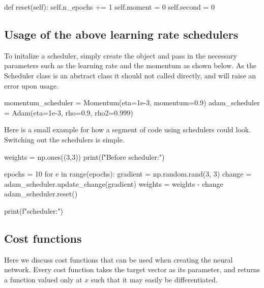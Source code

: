 \documentclass[%
oneside,                 %
final,                   %
10pt]{article}
\begin{document}
    def reset(self):
        self.n_epochs += 1
        self.moment = 0
        self.second = 0


\epycod


\subsection{Usage of the above learning rate schedulers}

To initalize a scheduler, simply create the object and pass in the
necessary parameters such as the learning rate and the momentum as
shown below. As the Scheduler class is an abstract class it should not
called directly, and will raise an error upon usage.




\bpycod
momentum_scheduler = Momentum(eta=1e-3, momentum=0.9)
adam_scheduler = Adam(eta=1e-3, rho=0.9, rho2=0.999)

\epycod


Here is a small example for how a segment of code using schedulers
could look. Switching out the schedulers is simple.













\bpycod
weights = np.ones((3,3))
print(f"Before scheduler:")

epochs = 10
for e in range(epochs):
    gradient = np.random.rand(3, 3)
    change = adam_scheduler.update_change(gradient)
    weights = weights - change
    adam_scheduler.reset()

print(f"\nAfter scheduler:")

\epycod


\subsection{Cost functions}

Here we discuss cost functions that can be used when creating the
neural network. Every cost function takes the target vector as its
parameter, and returns a function valued only at $x$ such that it may
easily be differentiated.
\end{document}
